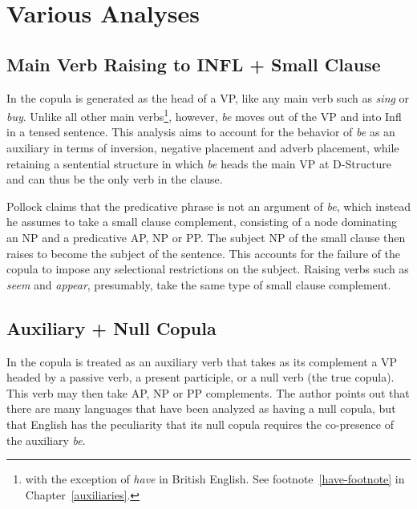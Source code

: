 

\section{Various Analyses}
\label{sm-clause-other-analyses}

\subsection{Main Verb Raising to INFL + Small Clause}

In \cite{pollack89} the copula is generated as the head of a VP, like any main
verb such as {\it sing} or {\it buy}. Unlike all other main verbs\footnote{with
the exception of {\it have} in British English. See
footnote~\ref{have-footnote} in Chapter~\ref{auxiliaries}.}, however, {\it be}
moves out of the VP and into Infl in a tensed sentence.  This analysis aims to
account for the behavior of {\it be} as an auxiliary in terms of inversion,
negative placement and adverb placement, while retaining a sentential structure
in which {\it be} heads the main VP at D-Structure and can thus be the only
verb in the clause.

Pollock claims that the predicative phrase is not an argument of {\it be},
which instead he assumes to take a small clause complement, consisting of a
node dominating an NP and a predicative AP, NP or PP. The subject NP of the
small clause then raises to become the subject of the sentence.  This accounts
for the failure of the copula to impose any selectional restrictions on the
subject.  Raising verbs such as {\it seem} and {\it appear}, presumably, take the
same type of small clause complement.

\subsection{Auxiliary + Null Copula}
\label{la}

In \cite{lapointe80} the copula is treated as an auxiliary verb that takes as its
complement a VP headed by a passive verb, a present participle, or a null verb
(the true copula). This verb may then take AP, NP or PP complements.  The
author points out that there are many languages that have been analyzed as
having a null copula, but that English has the peculiarity that its
null copula requires the co-presence of the auxiliary {\it be}.

